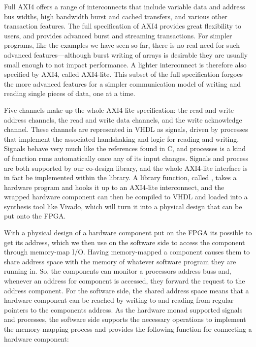 \documentclass[../main.tex]{subfiles}
\begin{document}
Full AXI4 offers a range of interconnects that include variable data and address bus widths, high bandwidth burst and cached transfers, and various other transaction features. The full specification of AXI4 provides great flexibility to users, and provides advanced burst and streaming transactions. For simpler programs, like the examples we have seen so far, there is no real need for such advanced features---although burst writing of arrays is desirable they are usually small enough to not impact performance. A lighter interconnect is therefore also specified by AXI4, called AXI4-lite. This subset of the full specification forgoes the more advanced features for a simpler communication model of writing and reading single pieces of data, one at a time.

Five channels make up the whole AXI4-lite specification: the read and write address channels, the read and write data channels, and the write acknowledge channel. These channels are represented in VHDL as signals, driven by processes that implement the associated handshaking and logic for reading and writing. Signals behave very much like the references found in C, and processes is a kind of function runs automatically once any of its input changes. Signals and process are both supported by our co-design library, and the whole AXI4-lite interface is in fact be implemented within the library. A library function, called , takes a hardware program and hooks it up to an AXI4-lite interconnect, and the wrapped hardware component can then be compiled to VHDL and loaded into a synthesis tool like Vivado, which will turn it into a physical design that can be put onto the FPGA.

With a physical design of a hardware component put on the FPGA its possible to get its address, which we then use on the software side to access the component through memory-map I/O. Having memory-mapped a component causes them to share address space with the memory of whatever software program they are running in. So, the components can monitor a processors address buss and, whenever an address for component is accessed, they forward the request to the address component. For the software side, the shared address space means that a hardware component can be reached by writing to and reading from regular pointers to the components address. As the hardware monad supported signals and processes, the software side supports the necessary operations to implement the memory-mapping process and provides the following function for connecting a hardware component:
\end{document}
